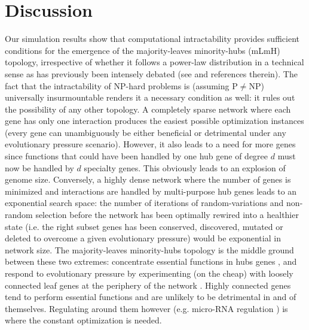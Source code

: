 \section{Discussion}
Our simulation results show that computational intractability provides sufficient conditions for the emergence of the majority-leaves minority-hubs (mLmH) topology, irrespective of whether it follows a power-law distribution in a technical sense as has previously been intensely debated (see \cite{lima-mendez_powerful_2009} and references therein). The fact that the intractability of NP-hard problems is (assuming P$\neq$NP) universally insurmountable renders it a necessary condition as well: it rules out the possibility of any other topology. A completely sparse network where each gene has only one interaction produces the easiest possible optimization instances (every gene can unambiguously be either beneficial or detrimental under any evolutionary pressure scenario). However, it also leads to a need for more genes since functions that could have been handled by one hub gene of degree $d$ must now be handled by $d$ specialty genes. This obviously leads to an explosion of genome size. Conversely, a highly dense network where the number of genes is minimized and interactions are handled by multi-purpose hub genes leads to an exponential search space: the number of iterations of random-variations and non-random selection \cite{carvunis_proto-genes_2012} before the network has been optimally rewired into a healthier state (i.e. the right subset genes has been conserved, discovered, mutated or deleted to overcome a given evolutionary pressure)  would be exponential in network size. The majority-leaves minority-hubs topology is the middle ground between these two extremes: concentrate essential functions in hubs genes \cite{gerstein_architecture_2012}, and respond to evolutionary pressure by experimenting (on the cheap) with loosely connected leaf genes at the periphery of the network \cite{kim_positive_2007}. Highly connected genes tend to perform essential functions \cite{khurana_interpretation_2013} and are unlikely to be detrimental in and of themselves. Regulating around them however (e.g. micro-RNA regulation \cite{gerstein_architecture_2012}) is where the constant optimization is needed. 

